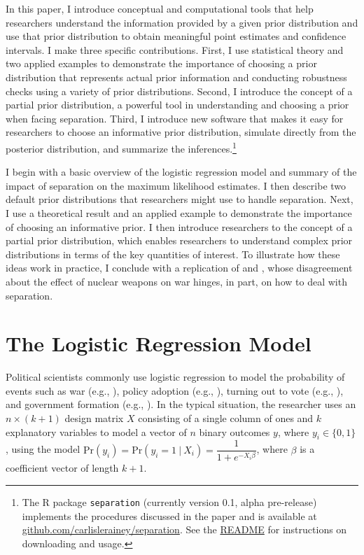 \documentclass[12pt]{article}
\begin{document}
In this paper, I introduce conceptual and computational tools that help researchers understand the information provided by a given prior distribution and use that prior distribution to obtain meaningful point estimates and confidence intervals. 
I make three specific contributions. 
First, I use statistical theory and two applied examples to demonstrate the importance of choosing a prior distribution that represents actual prior information and conducting robustness checks using a variety of prior distributions. 
Second, I introduce the concept of a partial prior distribution, a powerful tool in understanding and choosing a prior when facing separation. 
Third, I introduce new software that makes it easy for researchers to choose an informative prior distribution, simulate directly from the posterior distribution, and summarize the inferences.\footnote{
The R package \texttt{separation} (currently version 0.1, alpha pre-release) implements the procedures discussed in the paper and is available at \href{https://github.com/carlislerainey/separation}{github.com/carlislerainey/separation}. 
See the \href{https://github.com/carlislerainey/separation/blob/master/README.md}{README} for instructions on downloading and usage.}

I begin with a basic overview of the logistic regression model and summary of the impact of separation on the maximum likelihood estimates. 
I then describe two default prior distributions that researchers might use to handle separation. 
Next, I use a theoretical result and an applied example to demonstrate the importance of choosing an informative prior. 
I then introduce researchers to the concept of a partial prior distribution, which enables researchers to understand complex prior distributions in terms of the key quantities of interest. 
To illustrate how these ideas work in practice, I conclude with a replication of \cite{Rauchhaus2009} and \cite{BellMiller2015}, whose disagreement about the effect of nuclear weapons on war hinges, in part, on how to deal with separation.

\section*{The Logistic Regression Model}

Political scientists commonly use logistic regression to model the probability of events such as war (e.g., \citealt{Fearon1994}), policy adoption (e.g., \citealt{BerryBerry1990}), turning out to vote (e.g., \citealt{WolfingerRosenstone1980}), and government formation (e.g., \citealt{MartinStevenson2001}). 
In the typical situation, the researcher uses an $n \times (k + 1)$ design matrix $X$ consisting of a single column of ones and $k$ explanatory variables to model a vector of $n$ binary outcomes $y$, where $y_i \in \{0, 1\}$, using the model $\text{Pr}(y_i) = \text{Pr}(y_i = 1~|~ X_i) = \dfrac{1}{1 + e^{-X_i\beta}}$, where $\beta$ is a coefficient vector of length $k + 1$. 
\end{document}
